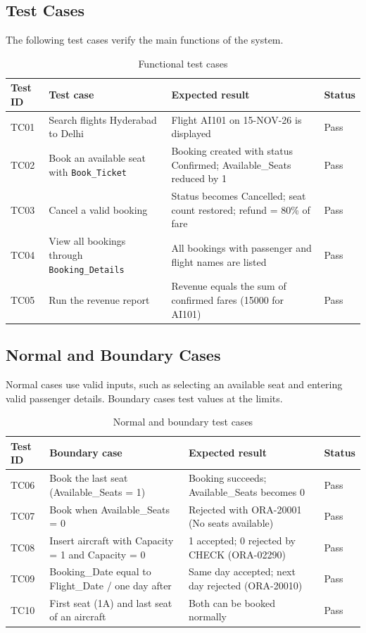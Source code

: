 \documentclass[12pt,a4paper]{article}
\begin{document}
\subsection{Test Cases}
The following test cases verify the main functions of the system.
\begin{table}[H]
\centering\small
\begin{tabularx}{\textwidth}{l l X l}
\toprule
\textbf{Test ID} & \textbf{Test case} & \textbf{Expected result} & \textbf{Status}\\
\midrule
TC01 & Search flights Hyderabad to Delhi & Flight AI101 on 15-NOV-26 is displayed & Pass\\
TC02 & Book an available seat with \texttt{Book\_Ticket} & Booking created with status Confirmed; Available_Seats reduced by 1 & Pass\\
TC03 & Cancel a valid booking & Status becomes Cancelled; seat count restored; refund = 80\% of fare & Pass\\
TC04 & View all bookings through \texttt{Booking\_Details} & All bookings with passenger and flight names are listed & Pass\\
TC05 & Run the revenue report & Revenue equals the sum of confirmed fares (15000 for AI101) & Pass\\
\bottomrule
\end{tabularx}
\caption{Functional test cases}
\end{table}

\subsection{Normal and Boundary Cases}
Normal cases use valid inputs, such as selecting an available seat and entering valid passenger details.
Boundary cases test values at the limits.
\begin{table}[H]
\centering\small
\begin{tabularx}{\textwidth}{l X X l}
\toprule
\textbf{Test ID} & \textbf{Boundary case} & \textbf{Expected result} & \textbf{Status}\\
\midrule
TC06 & Book the last seat (Available_Seats = 1) & Booking succeeds; Available_Seats becomes 0 & Pass\\
TC07 & Book when Available_Seats = 0 & Rejected with ORA-20001 (No seats available) & Pass\\
TC08 & Insert aircraft with Capacity = 1 and Capacity = 0 & 1 accepted; 0 rejected by CHECK (ORA-02290) & Pass\\
TC09 & Booking_Date equal to Flight_Date / one day after & Same day accepted; next day rejected (ORA-20010) & Pass\\
TC10 & First seat (1A) and last seat of an aircraft & Both can be booked normally & Pass\\
\bottomrule
\end{tabularx}
\caption{Normal and boundary test cases}
\end{table}
\end{document}
